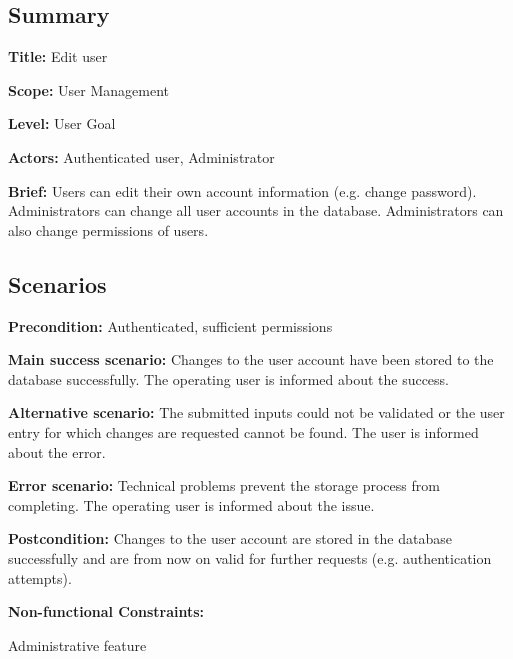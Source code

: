 \subsection*{Summary}


\begin{DoxyItemize}
\item {\bfseries Title\+:} Edit user
\item {\bfseries Scope\+:} User Management
\item {\bfseries Level\+:} User Goal
\item {\bfseries Actors\+:} Authenticated user, Administrator
\item {\bfseries Brief\+:} Users can edit their own account information (e.\+g. change password). Administrators can change all user accounts in the database. Administrators can also change permissions of users.
\end{DoxyItemize}

\subsection*{Scenarios}


\begin{DoxyItemize}
\item {\bfseries Precondition\+:} Authenticated, sufficient permissions
\item {\bfseries Main success scenario\+:} Changes to the user account have been stored to the database successfully. The operating user is informed about the success.
\item {\bfseries Alternative scenario\+:} The submitted inputs could not be validated or the user entry for which changes are requested cannot be found. The user is informed about the error.
\item {\bfseries Error scenario\+:} Technical problems prevent the storage process from completing. The operating user is informed about the issue.
\item {\bfseries Postcondition\+:} Changes to the user account are stored in the database successfully and are from now on valid for further requests (e.\+g. authentication attempts).
\item {\bfseries Non-\/functional Constraints\+:}
\begin{DoxyItemize}
\item Administrative feature 
\end{DoxyItemize}
\end{DoxyItemize}